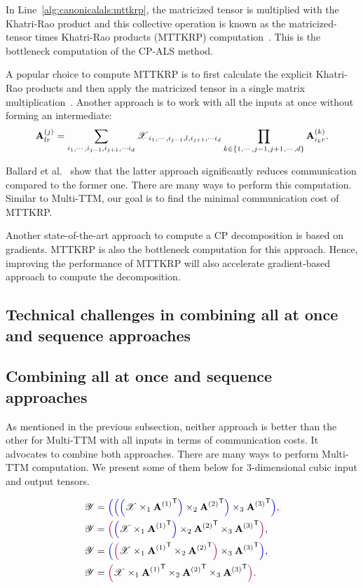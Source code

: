 \documentclass[a4paper,11pt]{article}
\newcommand{\X}{\T{X}}
\newcommand{\Y}{\T{Y}}
\newcommand{\allatoncecolor}{\color{purple}}
\newcommand{\seqcolor}{\color{blue}}
\newcommand{\allatoncestart}{{\allatoncecolor\Big(}}
\newcommand{\allatonceend}{{\allatoncecolor\Big)}}
\newcommand{\seqstart}{{\seqcolor\Big(}}
\newcommand{\seqend}{{\seqcolor\Big)}}
\begin{document}
	In Line~\ref{alg:canonicalals:mttkrp}, the matricized tensor is multiplied with the Khatri-Rao product and this collective operation is known as the matricized-tensor times Khatri-Rao products (MTTKRP) computation~\cite{LCPSV-IPDPS-2017}. This is the bottleneck computation of the CP-ALS method.
	
	A popular choice to compute MTTKRP is to first calculate the explicit Khatri-Rao products and then apply the matricized tensor in a single matrix multiplication~\cite{BK-SIAM-2008}. Another approach is to work with all the inputs at once without forming an intermediate: 
	$$\Mn{A}{j}_{lr} = \sum_{i_1,\cdots,i_{j-1},i_{j+1},\cdots i_d}\X_{i_1,\cdots,i_{j-1},l,i_{j+1},\cdots i_d}\prod_{k\in{\{1,\cdots,j-1,j+1,\cdots,d\}}}\Mn{A}{k}_{i_k r}.$$
	
	Ballard et al.~\cite{BNR-IPDPS-2018} show that the latter approach significantly reduces communication compared to the former one. There are many ways to perform this computation. Similar to Multi-TTM, our goal is to find the minimal communication cost of MTTKRP. 
	
	
	Another state-of-the-art approach to compute a CP decomposition is based on gradients. MTTKRP is also the bottleneck computation for this approach. Hence, improving the performance of MTTKRP will also accelerate gradient-based approach to compute the decomposition.
	
	
	\subsection{Technical challenges in combining all at once and sequence approaches}
	\label{sec:challenges}
	\subsection{Combining all at once and sequence approaches}
	As mentioned in the previous subsection, neither approach is better than the other for Multi-TTM with all inputs in terms of communication costs.  It advocates to combine both approaches. There are many ways to perform Multi-TTM computation.  We present some of them below for  3-dimensional cubic input and output tensors.	 
	
	\begin{align*}
		\Y&=\seqstart\seqstart\seqstart\X\times_1{\Mn{A}{1}}^\Tra \seqend\times_2{\Mn{A}{2}}^\Tra\seqend\times_3{\Mn{A}{3}}^\Tra\seqend,\\
		\Y&=\allatoncestart\seqstart\X \times_1 {\Mn{A}{1}}^\Tra \seqend \times_2 {\Mn{A}{2}}^\Tra \times_3 {\Mn{A}{3}}^\Tra \allatonceend,\\
		\Y &= \seqstart\allatoncestart\X \times_1 {\Mn{A}{1}}^\Tra \times_2 {\Mn{A}{2}}^\Tra\allatonceend \times_3 {\Mn{A}{3}}^\Tra\seqend,\\
		\Y &= \allatoncestart\X \times_1 {\Mn{A}{1}}^\Tra \times_2 {\Mn{A}{2}}^\Tra \times_3 {\Mn{A}{3}}^\Tra\allatonceend.
	\end{align*}
	
\end{document}
